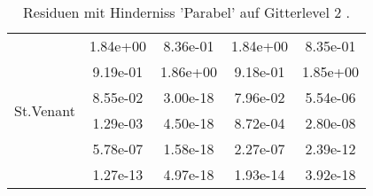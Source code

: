 \begin{table}
\begin{tabular}{c|cc|cc|}
\hline 
\multicolumn{1}{|c|}{\multirow{6}{*}{St.Venant}} &\multicolumn{1}{|c|}{  1.84e+00} & \multicolumn{1}{|c|}{  8.36e-01} & \multicolumn{1}{|c|}{  1.84e+00} & \multicolumn{1}{|c|}{  8.35e-01} \\ 
\multicolumn{1}{|c|}{} & \multicolumn{1}{|c|}{  9.19e-01} & \multicolumn{1}{|c|}{  1.86e+00} & \multicolumn{1}{|c|}{  9.18e-01} & \multicolumn{1}{|c|}{  1.85e+00} \\ 
\multicolumn{1}{|c|}{} & \multicolumn{1}{|c|}{  8.55e-02} & \multicolumn{1}{|c|}{  3.00e-18} & \multicolumn{1}{|c|}{  7.96e-02} & \multicolumn{1}{|c|}{  5.54e-06} \\ 
\multicolumn{1}{|c|}{} & \multicolumn{1}{|c|}{  1.29e-03} & \multicolumn{1}{|c|}{  4.50e-18} & \multicolumn{1}{|c|}{  8.72e-04} & \multicolumn{1}{|c|}{  2.80e-08} \\ 
\multicolumn{1}{|c|}{} & \multicolumn{1}{|c|}{  5.78e-07} & \multicolumn{1}{|c|}{  1.58e-18} & \multicolumn{1}{|c|}{  2.27e-07} & \multicolumn{1}{|c|}{  2.39e-12} \\ 
\multicolumn{1}{|c|}{} & \multicolumn{1}{|c|}{  1.27e-13} & \multicolumn{1}{|c|}{  4.97e-18} & \multicolumn{1}{|c|}{  1.93e-14} & \multicolumn{1}{|c|}{  3.92e-18} \\ 
\hline 
\end{tabular}\caption{Residuen mit Hinderniss 'Parabel' auf Gitterlevel 2 .}\label{tab:Residuum_Parabel_level2}
\end{table} 
